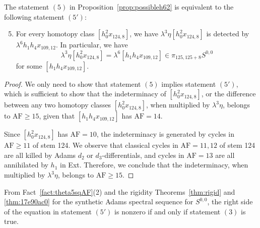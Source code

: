 \documentclass{amsart}
\numberwithin{equation}{section}
\newcommand{\AF}{\mathrm{AF}}
\begin{document}
\begin{lemma} \label{lem:equistate5}
    The statement $(5)$ in Proposition~\ref{prop:possibleh62} is equivalent to the following statement $(5')$:
    \begin{enumerate}[label=(\arabic*')]\setcounter{enumi}{4} 
    \item For every homotopy class $[h_0^2x_{124,8}]$, we have
    $\lambda^3 \eta [h_0^2x_{124,8}]$ is detected by $\lambda^6 h_1h_4x_{109,12}$. In particular, we have 
    $$\lambda^3 \eta [h_0^2x_{124,8}] = \lambda^6 [h_1h_4x_{109,12}] \in \pi_{125,125+8} S^{0,0}$$
    for some $[h_1h_4x_{109,12}]$.
    \end{enumerate}
\end{lemma}

\begin{proof}
    We only need to show that statement $(5)$ implies statement $(5')$, which is sufficient to show that the indeterminacy of $[h_0^2x_{124,8}]$, or the difference between any two homotopy classes $[h_0^2x_{124,8}]$, when multiplied by $\lambda^3 \eta$, belongs to $\AF \ge 15$, given that $[h_1h_4x_{109,12}]$ has $\AF=14$.

    Since $[h_0^2x_{124,8}]$ has $\AF=10$, the indeterminacy is generated by cycles in $\AF \ge 11$ of stem 124. We observe that classical cycles in $\AF=11, 12$ of stem 124 are all killed by Adams $d_2$ or $d_3$-differentials, and cycles in $\AF=13$ are all annihilated by $h_1$ in Ext. Therefore, we conclude that the indeterminacy, when multiplied by $\lambda^3 \eta$, belongs to $\AF \ge 15$.
\end{proof}

\begin{remark}
    From Fact~\ref{fact:theta5sqAF}(2) and the rigidity Theorems~\ref{thm:rigid} and \ref{thm:17e90ac0} for the synthetic Adams spectral sequence for $S^{0,0}$, the right side of the equation in statement $(5')$ is nonzero if and only if statement $(3)$ is true.
\end{remark}




\end{document}
